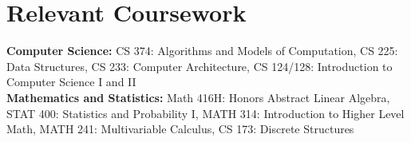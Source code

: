 \documentclass{article}
\begin{document}
\section{Relevant Coursework}
\begin{itemize}[leftmargin=0.15in, label={}]
	\small{\item{
		           {\textbf{Computer Science:} CS 374: Algorithms and Models of Computation, CS 225: Data Structures, CS 233: Computer Architecture, CS 124/128: Introduction to Computer Science I and II \\
               \textbf{Mathematics and Statistics:} Math 416H: Honors Abstract Linear Algebra, STAT 400: Statistics and Probability I, MATH 314: Introduction to Higher Level Math, MATH 241: Multivariable Calculus, CS 173: Discrete Structures}\\
		      }}
\end{itemize}



\vspace{-10pt}
\end{document}
